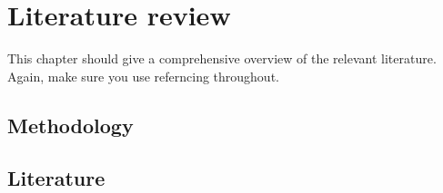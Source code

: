 \chapter{Literature review}
This chapter should give a comprehensive overview of the relevant literature.
Again, make sure you use referncing throughout.


\section{Methodology}
\lipsum[5-15]

\section{Literature}
\lipsum[16-25]
